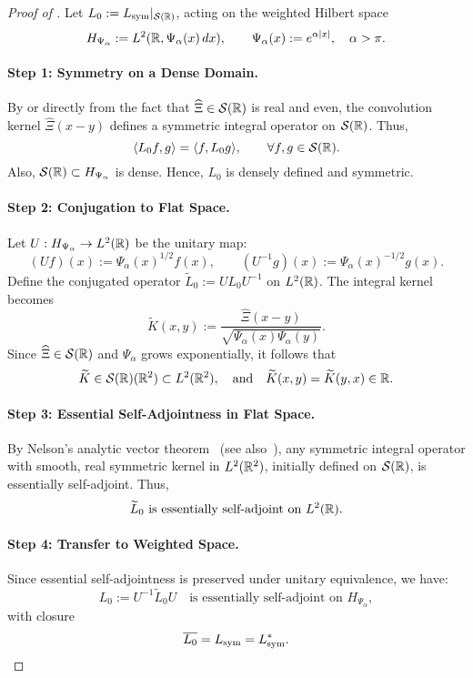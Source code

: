 \begin{proof}[Proof of ]
Let \( L_0 := L_{\mathrm{sym}}|_{\mathcal{S}(\mathbb{R})} \), acting on the weighted Hilbert space
\[
H_{\Psi_\alpha} := L^2(\mathbb{R}, \Psi_\alpha(x)\, dx), \qquad \Psi_\alpha(x) := e^{\alpha |x|}, \quad \alpha > \pi.
\]

\paragraph{Step 1: Symmetry on a Dense Domain.}
By  or directly from the fact that \( \widehat{\Xi} \in \mathcal{S}(\mathbb{R}) \) is real and even, the convolution kernel \( \widehat{\Xi}(x - y) \) defines a symmetric integral operator on \( \mathcal{S}(\mathbb{R}) \). Thus,
\[
\langle L_0 f, g \rangle = \langle f, L_0 g \rangle, \qquad \forall f, g \in \mathcal{S}(\mathbb{R}).
\]
Also, \( \mathcal{S}(\mathbb{R}) \subset H_{\Psi_\alpha} \) is dense. Hence, \( L_0 \) is densely defined and symmetric.

\paragraph{Step 2: Conjugation to Flat Space.}
Let \( U : H_{\Psi_\alpha} \to L^2(\mathbb{R}) \) be the unitary map:
\[
(Uf)(x) := \Psi_\alpha(x)^{1/2} f(x), \qquad (U^{-1}g)(x) := \Psi_\alpha(x)^{-1/2} g(x).
\]
Define the conjugated operator \( \widetilde{L}_0 := U L_0 U^{-1} \) on \( L^2(\mathbb{R}) \). The integral kernel becomes
\[
\widetilde{K}(x, y) := \frac{\widehat{\Xi}(x - y)}{\sqrt{\Psi_\alpha(x)\Psi_\alpha(y)}}.
\]
Since \( \widehat{\Xi} \in \mathcal{S}(\mathbb{R}) \) and \( \Psi_\alpha \) grows exponentially, it follows that
\[
\widetilde{K} \in \mathcal{S}(\mathbb{R})(\mathbb{R}^2) \subset L^2(\mathbb{R}^2), \quad \text{and} \quad \widetilde{K}(x, y) = \widetilde{K}(y, x) \in \mathbb{R}.
\]

\paragraph{Step 3: Essential Self-Adjointness in Flat Space.}
By Nelson’s analytic vector theorem~\cite[Thm.~X.36]{ReedSimon1975II} (see also~\cite[Prop.~13.3]{ReedSimon1980I}), any symmetric integral operator with smooth, real symmetric kernel in \( L^2(\mathbb{R}^2) \), initially defined on \( \mathcal{S}(\mathbb{R}) \), is essentially self-adjoint. Thus,
\[
\widetilde{L}_0 \text{ is essentially self-adjoint on } L^2(\mathbb{R}).
\]

\paragraph{Step 4: Transfer to Weighted Space.}
Since essential self-adjointness is preserved under unitary equivalence, we have:
\[
L_0 := U^{-1} \widetilde{L}_0 U \quad \text{is essentially self-adjoint on } H_{\Psi_\alpha},
\]
with closure
\[
\overline{L_0} = L_{\mathrm{sym}} = L_{\mathrm{sym}}^*.
\]


\end{proof}
